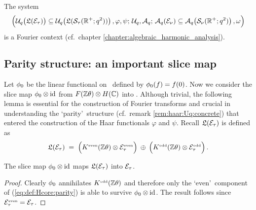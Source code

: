 \begin{thm} \label{thm:Fourier_context}
The system
$$\left( \Uq\!\left(\calL(\Hcore_\tau)\vertM\right)  \subseteq
         \Uq\!\left(\calL({\mathcal S}_\tau(\RR^+;q^2)) \vertM \right),
                \varphi, \psi; \, \Uq, \Aq; \,
                \Aq(\Hcore_\nu) \subseteq
         \Aq\!\left({\mathcal S}_\nu(\RR^+;q^2)\vertM \right),
          \omega \vertL \right)$$
is a Fourier context (cf.\ chapter \ref{chapter:algebraic_harmonic_analysis}).
\end{thm}



\subsection{Parity structure: an important slice map}

Let $\phi_0$ be the linear functional on \FZ\ defined by $\phi_0(f)=f(0)$.
Now we consider the slice map $\phi_0 \otimes \mbox{\rm id}$ from $F(\mathbb{Z} \theta) \otimes H(\mathbb{C})$ into \HC\@.
Although trivial, the following lemma is essential for the construction of
Fourier transforms and crucial in understanding the \lq parity\rq\ structure
(cf.\ remark \ref{rem:haar:Uq:concrete})
that entered the construction of the Haar functionals $\varphi$ and $\psi$.
Recall $\mathfrak{L}(\mathcal E_\tau)$ is defined as
\begin{equation} \label{eq:def:Hcore:parity}
\calL(\Hcore_\tau) \;=\;  \left(\KZeven \tens \Hcore_\tau^\scripteven \vertL\right)
                                              \:\oplus\:
                          \left(\KZodd  \tens \Hcore_\tau^\scriptodd \vertL\right).
\end{equation}



\begin{lemma} \label{lemma:slice_map:parity}
The slice map\/ $\phi_0 \otimes \mbox{\rm id}$ maps\/ $\mathfrak{L}(\mathcal E_\tau)$ into\/ $\mathcal E_\tau$.
\end{lemma}
\begin{proof}
Clearly $\phi_0$ annihilates $K^{\rm \scriptscriptstyle odd}(\mathbb{Z} \theta)$ and therefore only the \lq even\rq\ component of
(\ref{eq:def:Hcore:parity}) is able to survive $\phi_0 \otimes \mbox{\rm id}$.
The result follows since $\mathcal E_\tau^{\rm \scriptscriptstyle even} = \mathcal E_\tau$.
\end{proof}



